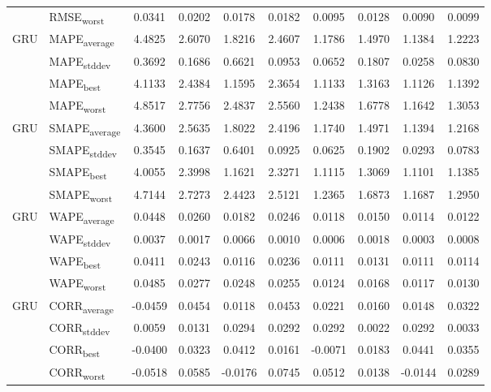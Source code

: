{\begin{longtable}{l l c c c c c c c c}
 & RMSE\textsubscript{worst} & 0.0341 & 0.0202 & 0.0178 & 0.0182 & 0.0095 & 0.0128 & 0.0090 & 0.0099 \\
\cmidrule(lr){2-10}
\multirow{4}{*}{GRU} & MAPE\textsubscript{average} & 4.4825 & 2.6070 & 1.8216 & 2.4607 & 1.1786 & 1.4970 & 1.1384 & 1.2223 \\
 & MAPE\textsubscript{stddev} & 0.3692 & 0.1686 & 0.6621 & 0.0953 & 0.0652 & 0.1807 & 0.0258 & 0.0830 \\
 & MAPE\textsubscript{best} & 4.1133 & 2.4384 & 1.1595 & 2.3654 & 1.1133 & 1.3163 & 1.1126 & 1.1392 \\
 & MAPE\textsubscript{worst} & 4.8517 & 2.7756 & 2.4837 & 2.5560 & 1.2438 & 1.6778 & 1.1642 & 1.3053 \\
\cmidrule(lr){2-10}
\multirow{4}{*}{GRU} & SMAPE\textsubscript{average} & 4.3600 & 2.5635 & 1.8022 & 2.4196 & 1.1740 & 1.4971 & 1.1394 & 1.2168 \\
 & SMAPE\textsubscript{stddev} & 0.3545 & 0.1637 & 0.6401 & 0.0925 & 0.0625 & 0.1902 & 0.0293 & 0.0783 \\
 & SMAPE\textsubscript{best} & 4.0055 & 2.3998 & 1.1621 & 2.3271 & 1.1115 & 1.3069 & 1.1101 & 1.1385 \\
 & SMAPE\textsubscript{worst} & 4.7144 & 2.7273 & 2.4423 & 2.5121 & 1.2365 & 1.6873 & 1.1687 & 1.2950 \\
\cmidrule(lr){2-10}
\multirow{4}{*}{GRU} & WAPE\textsubscript{average} & 0.0448 & 0.0260 & 0.0182 & 0.0246 & 0.0118 & 0.0150 & 0.0114 & 0.0122 \\
 & WAPE\textsubscript{stddev} & 0.0037 & 0.0017 & 0.0066 & 0.0010 & 0.0006 & 0.0018 & 0.0003 & 0.0008 \\
 & WAPE\textsubscript{best} & 0.0411 & 0.0243 & 0.0116 & 0.0236 & 0.0111 & 0.0131 & 0.0111 & 0.0114 \\
 & WAPE\textsubscript{worst} & 0.0485 & 0.0277 & 0.0248 & 0.0255 & 0.0124 & 0.0168 & 0.0117 & 0.0130 \\
\cmidrule(lr){2-10}
\multirow{4}{*}{GRU} & CORR\textsubscript{average} & -0.0459 & 0.0454 & 0.0118 & 0.0453 & 0.0221 & 0.0160 & 0.0148 & 0.0322 \\
 & CORR\textsubscript{stddev} & 0.0059 & 0.0131 & 0.0294 & 0.0292 & 0.0292 & 0.0022 & 0.0292 & 0.0033 \\
 & CORR\textsubscript{best} & -0.0400 & 0.0323 & 0.0412 & 0.0161 & -0.0071 & 0.0183 & 0.0441 & 0.0355 \\
 & CORR\textsubscript{worst} & -0.0518 & 0.0585 & -0.0176 & 0.0745 & 0.0512 & 0.0138 & -0.0144 & 0.0289 \\

\end{longtable}}
